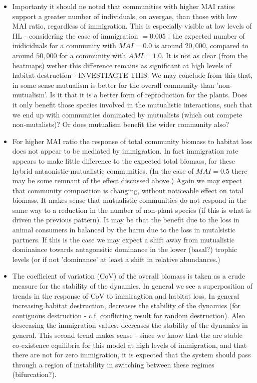 \begin{itemize}
	\item Importanty it should ne noted that communities with higher MAI ratios support a greater number of individuals, on avergae, than those with low MAI ratio, regardless of immigration. This is especially visible at low levels of HL - considering the case of immigration $= 0.005$ : the expected number of inidiciduals for a community with $MAI=0.0$ is around $20,000$, compared to around $50,000$ for a community with $AMI=1.0$. It is not as clear (from the heatmaps) wether this difference remains as significant at high levels of habitat destruction - INVESTIAGTE THIS. We may conclude from this that, in some sense mutualism is better for the overall community than 'non-mutualism'. Is it that it is a better form of reproduction for the plants. Does it only benefit those species involved in the mutualistic interactions, such that we end up with communities dominated by mutualists (which out compete non-mutalists)? Or does mutualism benefit the wider community also?
	
	\item For higher MAI ratio the response of total community biomass to habitat loss does not appear to be mediated by immigration. In fact immigration rate appears to make little difference to the expected total biomass, for these hybrid antaonistic-mutualistic communities. (In the case of $MAI=0.5$ there may be some remnant of the effect discussed above.) Again we may expect that community composition is changing, without noticeable effect on total biomass. It makes sense that mutualistic communities do not respond in the same way to a reduction in the number of non-plant species (if this is what is driven the previous pattern). It may be that the benefit due to the loss in animal consumers in balanced by the harm due to the loss in mutalsistic partners. If this is the case we may expect a shift away from mutualistic dominaince towards antagonsitic dominance in the lower (basal?) trophic levels (or if not 'dominance' at least a shift in relative abundances.)  
	
	\item The coefficient of variation (CoV) of the overall biomass is taken as a crude measure for the stability of the dynamics. In general we see a superposition of trends in the response of CoV to immiragtion and habitat loss. In general increasing habitat destruction, decreases the stability of the dynamics (for contiguous destruction - c.f. conflicting result for random destruction). Also desceasing the immigration values, decreases the stability of the dynamics in general. This second trend makes sense -  since we know that the are stable co-existence equilibria  for this model at high levels of immigration, and that there are not for zero immigration, it is expected that the system should pass through a region of instability in switching between these regimes (bifurcation?).
	

\end{itemize}
